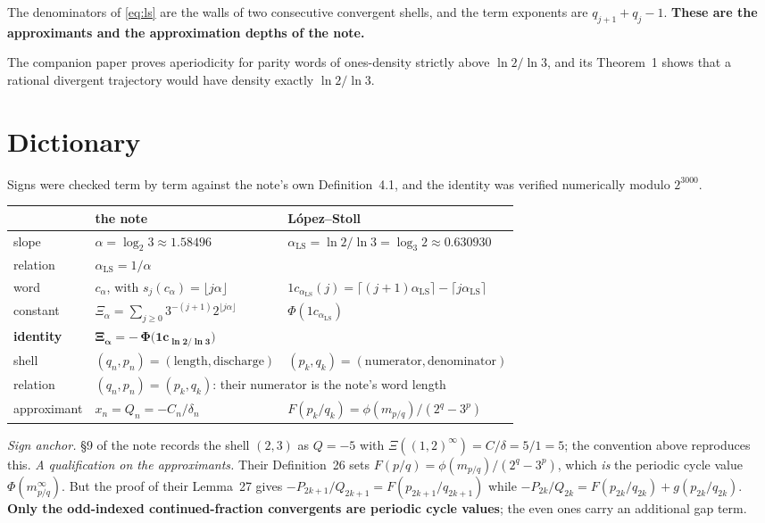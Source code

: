 \documentclass[10pt]{article}
\newcommand{\Xiac}{\Xi_{\alpha}}
\begin{document}
The denominators of \eqref{eq:ls} are the walls of two consecutive convergent shells, and the term
exponents are $q_{j+1}+q_j-1$. \textbf{These are the approximants and the approximation depths of
the note.}

The companion paper \cite{lopez2021periodicity} proves aperiodicity for parity words of
ones-density strictly above $\ln 2/\ln 3$, and its Theorem~1 shows that a rational divergent
trajectory would have density exactly $\ln 2/\ln 3$.

\section{Dictionary}

Signs were checked term by term against the note's own Definition~4.1, and the identity was
verified numerically modulo $2^{3000}$.

\begin{center}
\begin{tabular}{@{}lll@{}}
\toprule
& the note & L\'opez--Stoll \\
\midrule
slope & $\alpha=\log_2 3\approx 1.58496$ & $\alpha_{\mathrm{LS}}=\ln 2/\ln 3=\log_3 2\approx 0.630930$\\
relation & \multicolumn{2}{l}{$\alpha_{\mathrm{LS}} = 1/\alpha$}\\
word & $c_\alpha$, with $s_j(c_\alpha)=\lfloor j\alpha\rfloor$ & $1c_{\alpha_{\mathrm{LS}}}(j)=\lceil (j+1)\alpha_{\mathrm{LS}}\rceil-\lceil j\alpha_{\mathrm{LS}}\rceil$\\
constant & $\Xiac=\sum_{j\ge0}3^{-(j+1)}2^{\lfloor j\alpha\rfloor}$ & $\Phi(1c_{\alpha_{\mathrm{LS}}})$\\
\textbf{identity} & \multicolumn{2}{l}{$\boldsymbol{\Xiac = -\,\Phi\bigl(1c_{\ln 2/\ln 3}\bigr)}$}\\
shell & $(q_n,p_n)=(\text{length},\text{discharge})$ & $(p_k,q_k)=(\text{numerator},\text{denominator})$\\
relation & \multicolumn{2}{l}{$(q_n,p_n)=(p_k,q_k)$: their numerator is the note's word length}\\
approximant & $x_n=Q_n=-C_n/\delta_n$ & $F(p_k/q_k)=\phi(m_{p/q})/(2^{q}-3^{p})$\\
\bottomrule
\end{tabular}
\end{center}

\noindent\emph{Sign anchor.} \S9 of the note records the shell $(2,3)$ as $Q=-5$ with
$\Xi((1,2)^\infty)=C/\delta=5/1=5$; the convention above reproduces this.
\emph{A qualification on the approximants.} Their Definition~26 sets
$F(p/q)=\phi(m_{p/q})/(2^{q}-3^{p})$, which \emph{is} the periodic cycle value
$\Phi(m_{p/q}^{\infty})$. But the proof of their Lemma~27 gives
$-P_{2k+1}/Q_{2k+1}=F(p_{2k+1}/q_{2k+1})$ while
$-P_{2k}/Q_{2k}=F(p_{2k}/q_{2k})+g(p_{2k}/q_{2k})$. \textbf{Only the odd-indexed continued-fraction
convergents are periodic cycle values}; the even ones carry an additional gap term.
\end{document}
